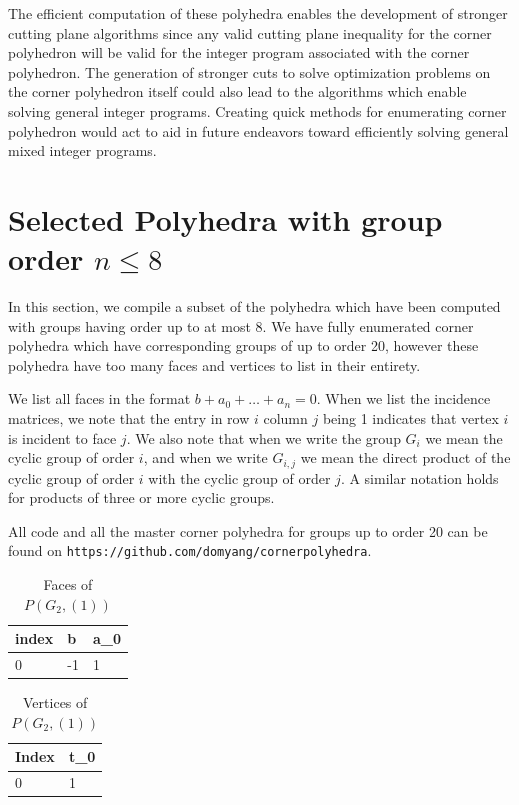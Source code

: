 \documentclass{article}
\begin{document}
	The efficient computation of these polyhedra enables the development of stronger cutting plane algorithms since any valid cutting plane inequality for the corner polyhedron will be valid for the integer program associated with the corner polyhedron. The generation of stronger cuts to solve optimization problems on the corner polyhedron itself could also lead to the algorithms which enable solving general integer programs. Creating quick methods for enumerating corner polyhedron would act to aid in future endeavors toward efficiently solving general mixed integer programs.
	
	
	
	
	\appendix
	\section{Selected Polyhedra with group order $n \le 8$}
	In this section, we compile a subset of the polyhedra which have been computed with groups having order up to at most 8. We have fully enumerated corner polyhedra which have corresponding groups of up to order 20, however these polyhedra have too many faces and vertices to list in their entirety.
	
	We list all faces in the format $b + a_0 + \ldots + a_n = 0$. When we list the incidence matrices, we note that the entry in row $i$ column $j$ being 1 indicates that vertex $i$ is incident to face $j$. We also note that when we write the group $G_{i}$ we mean the cyclic group of order $i$, and when we write $G_{i,j}$ we mean the direct product of the cyclic group of order $i$ with the cyclic group of order $j$. A similar notation holds for products of three or more cyclic groups.
	
	All code and all the master corner polyhedra for groups up to order 20 can be found on \texttt{https://github.com/domyang/cornerpolyhedra}.



\begin{table}[H]
	\centering
	\caption{Faces of $P(G_2, (1))$}
	\label{G2Faces1}
	\begin{tabular}{@{}lll@{}}
		\toprule
		index & b  & a\_0 \\ \midrule
		0     & -1 & 1    \\ \bottomrule
	\end{tabular}
\end{table}

\begin{table}[H]
	\centering
	\caption{Vertices of $P(G_2, (1))$}
	\label{G2Verts1}
	\begin{tabular}{@{}ll@{}}
		\toprule
		Index & t\_0 \\ \midrule
		0     & 1    \\ \bottomrule
	\end{tabular}
\end{table}
\end{document}
